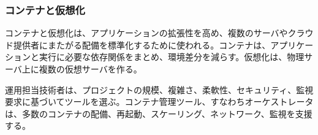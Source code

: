 \subsubsection{コンテナと仮想化}

コンテナと仮想化は、アプリケーションの拡張性を高め、複数のサーバやクラウド提供者にまたがる配備を標準化するために使われる。コンテナは、アプリケーションと実行に必要な依存関係をまとめ、環境差分を減らす。仮想化は、物理サーバ上に複数の仮想サーバを作る。

運用担当技術者は、プロジェクトの規模、複雑さ、柔軟性、セキュリティ、監視要求に基づいてツールを選ぶ。コンテナ管理ツール、すなわちオーケストレータは、多数のコンテナの配備、再起動、スケーリング、ネットワーク、監視を支援する。
